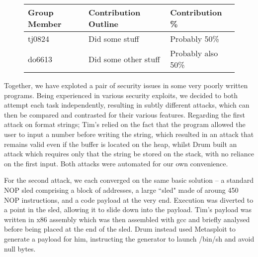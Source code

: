 \begin{figure}[h]
\centering
\begin{tabular}{|l|l|l|}
\hline
{\bf Group Member} & {\bf Contribution Outline} & {\bf Contribution \%} \\
\hline
tj0824 & Did some stuff & Probably 50\% \\
do6613 & Did some other stuff & Probably also 50\% \\
\hline
\end{tabular}
\end{figure}

Together, we have exploted a pair of security issues in some very poorly written programs. Being experienced in various security exploits, we decided to both attempt each task independently, resulting in subtly different attacks, which can then be compared and contrasted for their various features. Regarding the first attack on format strings; Tim's relied on the fact that the program allowed the user to input a number before writing the string, which resulted in an attack that remains valid even if the buffer is located on the heap, whilst Drum built an attack which requires only that the string be stored on the stack, with no reliance on the first input. Both attacks were automated for our own convenience.

For the second attack, we each converged on the same basic solution -- a standard NOP sled comprising a block of addresses, a large ``sled" made of aroung 450 NOP instructions, and a code payload at the very end. Execution was diverted to a point in the sled, allowing it to slide down into the payload. Tim's payload was written in x86 assembly which was then assembled with gcc and briefly analysed before being placed at the end of the sled. Drum instead used Metasploit to generate a payload for him, instructing the generator to launch /bin/sh and avoid null bytes.